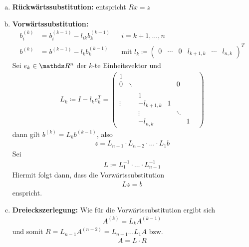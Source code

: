  
\begin{enumerate}[a)]
\item \textbf{Rückwärtssubstitution:}  
  entspricht $Rx=z$
\item \textbf{Vorwärtssubstitution:} 
  \begin{align*}
    b^{(k)}_i&=b_i^{(k-1)}-l_{ik}b_k^{(k-1)} && i=k+1, \dotsc , n\\
    b^{(k)} &= b^{(k-1)}-l_kb_k^{(k-1)} 
                                             && \text{mit }l_k\coloneqq 
                                                \begin{pmatrix}
                                                  0&\dotsm&0&l_{k+1,k}&\dotsm&l_{n,k}
                                                \end{pmatrix}^T
  \end{align*}
  Sei $e_k\in\R^n$ der $k$-te Einheitsvektor und 
  \begin{gather}
    L_k \coloneqq I- l_ke_k^T = \begin{pmatrix}
      1&&&&&&\\
      0&\ddots&&&0\\
      \\
      &&1\\
      \vdots&&-l_{k+1,k}&1\\
      &&\vdots&&\ddots \\
      &&-l_{n,k}&&&1
    \end{pmatrix}
    \label{II.1.9}
  \end{gather}
  dann gilt $b^{(k)} =L_kb^{(k-1)}$, also
  \begin{gather*}
    z = L_{n-1}\cdot L_{n-2} \cdot \ldots \cdot L_1b
  \end{gather*}
  Sei
  \begin{gather}
    L\coloneqq L_1^{-1} \cdot \ldots \cdot L_{n-1}^{-1}
    \label{II.1.10}
  \end{gather}
  Hiermit folgt dann, dass die Vorwärtssubstitution
  \begin{gather}
    Lz=b\label{II.1.11}
  \end{gather}
  enspricht.
\item \textbf{Dreieckszerlegung:}
  Wie für die Vorwärtssubstitution ergibt sich
  \begin{gather*}
    A^{(k)}=L_kA^{(k-1)}
  \end{gather*}
  und somit $R=L_{n-1}A^{(n-2)}= L_{n-1}\ldots L_1A $ bzw.
  \begin{gather} 
    A=L\cdot R
    \label{II.1.12}
  \end{gather}
\end{enumerate}


